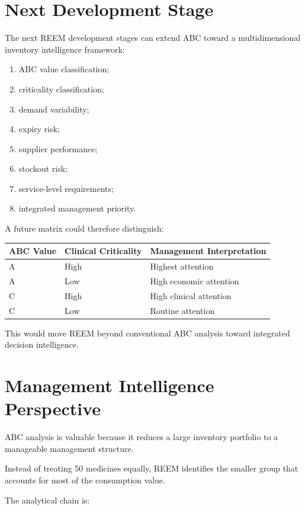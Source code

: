 \documentclass[12pt]{article}
\begin{document}
\section{Next Development Stage}

The next REEM development stages can extend ABC toward a multidimensional
inventory intelligence framework:

\begin{enumerate}
    \item ABC value classification;
    \item criticality classification;
    \item demand variability;
    \item expiry risk;
    \item supplier performance;
    \item stockout risk;
    \item service-level requirements;
    \item integrated management priority.
\end{enumerate}

A future matrix could therefore distinguish:

\begin{center}
\begin{tabular}{lll}
\toprule
ABC Value & Clinical Criticality & Management Interpretation\\
\midrule
A & High & Highest attention\\
A & Low & High economic attention\\
C & High & High clinical attention\\
C & Low & Routine attention\\
\bottomrule
\end{tabular}
\end{center}

This would move REEM beyond conventional ABC analysis toward integrated
decision intelligence.

\section{Management Intelligence Perspective}

ABC analysis is valuable because it reduces a large inventory portfolio to a
manageable management structure.

Instead of treating 50 medicines equally, REEM identifies the smaller group
that accounts for most of the consumption value.

The analytical chain is:
\end{document}
